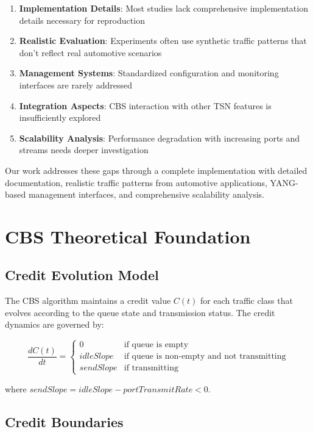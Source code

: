 \documentclass[10pt, journal, compsoc]{IEEEtran}
\begin{document}
\begin{enumerate}
    \item \textbf{Implementation Details}: Most studies lack comprehensive implementation details necessary for reproduction
    \item \textbf{Realistic Evaluation}: Experiments often use synthetic traffic patterns that don't reflect real automotive scenarios
    \item \textbf{Management Systems}: Standardized configuration and monitoring interfaces are rarely addressed
    \item \textbf{Integration Aspects}: CBS interaction with other TSN features is insufficiently explored
    \item \textbf{Scalability Analysis}: Performance degradation with increasing ports and streams needs deeper investigation
\end{enumerate}

Our work addresses these gaps through a complete implementation with detailed documentation, realistic traffic patterns from automotive applications, YANG-based management interfaces, and comprehensive scalability analysis.

\section{CBS Theoretical Foundation}
\label{sec:cbs_theory}

\subsection{Credit Evolution Model}

The CBS algorithm maintains a credit value $C(t)$ for each traffic class that evolves according to the queue state and transmission status. The credit dynamics are governed by:

\begin{equation}
\frac{dC(t)}{dt} = \begin{cases}
0 & \text{if queue is empty} \\
idleSlope & \text{if queue is non-empty and not transmitting} \\
sendSlope & \text{if transmitting}
\end{cases}
\end{equation}

where $sendSlope = idleSlope - portTransmitRate < 0$.

\subsection{Credit Boundaries}
\end{document}
